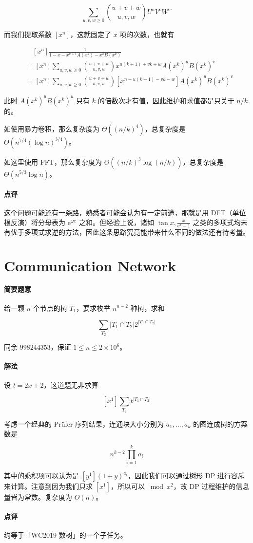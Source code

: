 \documentclass[12pt]{ctexart}
\theoremstyle{theorem}
\theoremstyle{theorem}
\begin{document}
$$
\sum_{u,v,w\ge 0} \binom{u+v+w}{u,v,w} U^uV^vW^w 
$$

而我们提取系数 $[x^n]$，这就固定了 $x$ 项的次数，也就有

$$
\begin{aligned}
&\quad [x^n] \frac 1{1-x-x^{k+1}A(x^k)-x^kB(x^k)}\\
&= [x^n]\sum_{u,v,w\ge 0} \binom{u+v+w}{u,v,w}x^{u(k+1)+vk+w}A(x^k)^uB(x^k)^v\\
&= [x^n]\sum_{u,v,w\ge 0} \binom{u+v+w}{u,v,w} [x^{n-u(k+1)-vk-w}] A(x^k)^uB(x^k)^v
\end{aligned}
$$

此时 $A(x^k)^uB(x^k)^u$ 只有 $k$ 的倍数次才有值，因此维护和求值都是只关于 $n/k$ 的。

如使用暴力卷积，那么复杂度为 $\Theta((n/k)^4)$，总复杂度是 $\Theta(n^{7/4}(\log n)^{3/4})$。

如这里使用 FFT，那么复杂度为 $\Theta((n/k)^3\log (n/k))$，总复杂度是 $\Theta(n^{5/3}\log n)$。

\paragraph{点评} 这个问题可能还有一条路，熟悉者可能会认为有一定前途，那就是用 DFT（单位根反演）将分母表为 $\mathrm{e}^{\omega x}$ 之和。但经验上说，诸如 $\tan x, \frac x{\mathrm e^x-1}$ 之类的多项式均未有优于多项式求逆的方法，因此这条思路究竟能带来什么不同的做法还有待考量。

\newpage

\section{Communication Network}

\paragraph{简要题意}

给一颗 $n$ 个节点的树 $T_1$，要求枚举 $n^{n-2}$ 种树，求和

$$
\sum_{T_2} |T_1 \cap T_2|2^{|T_1 \cap T_2|}
$$

同余 $998244353$，保证 $1\le n\le 2\times 10^6$。

\paragraph{解法}

设 $t=2x+2$，这道题无非求算

$$
[x^1] \sum_{T_2} t^{|T_1 \cap T_2|}
$$

考虑一个经典的 Pr\"ufer 序列结果，连通块大小分别为 $a_1,\dots,a_k$ 的图连成树的方案数是

$$
n^{k-2}\prod_{i=1}^k a_i
$$

其中的乘积项可以认为是 $[y^1](1+y)^{a_i}$，因此我们可以通过树形 DP 进行容斥来计算。注意到因为我们只求 $[x^1]$，所以可以 $\bmod x^2$，故 DP 过程维护的信息量皆为常数。复杂度为 $\Theta(n)$。

\paragraph{点评} 约等于「WC2019 数树」的一个子任务。
\end{document}
